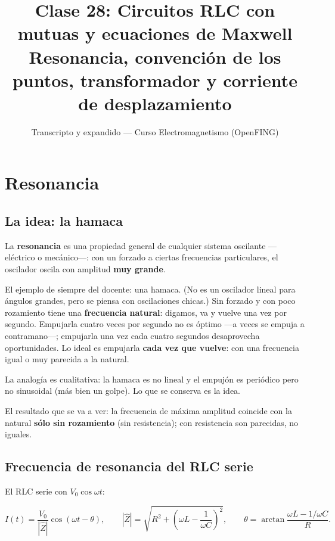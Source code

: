 \documentclass[12pt,a4paper]{article}
\title{\textbf{Clase 28: Circuitos RLC con mutuas y ecuaciones de Maxwell} \\[0.3em]
        \large{Resonancia, convención de los puntos, transformador y corriente de desplazamiento}}
\author{Transcripto y expandido --- Curso Electromagnetismo (OpenFING)}
\date{}
\begin{document}
\maketitle
\thispagestyle{empty}
\newpage

\tableofcontents
\newpage

\section{Resonancia}

\subsection{La idea: la hamaca}

La \textbf{resonancia} es una propiedad general de cualquier sistema oscilante
---eléctrico o mecánico---: con un forzado a ciertas frecuencias particulares, el
oscilador oscila con amplitud \textbf{muy grande}.

El ejemplo de siempre del docente: una hamaca. (No es un oscilador lineal para
ángulos grandes, pero se piensa con oscilaciones chicas.) Sin forzado y con poco
rozamiento tiene una \textbf{frecuencia natural}: digamos, va y vuelve una vez por
segundo. Empujarla cuatro veces por segundo no es óptimo ---a veces se empuja a
contramano---; empujarla una vez cada cuatro segundos desaprovecha oportunidades.
Lo ideal es empujarla \textbf{cada vez que vuelve}: con una frecuencia igual o muy
parecida a la natural.

\begin{notebox}
La analogía es cualitativa: la hamaca es no lineal y el empujón es periódico
pero no sinusoidal (más bien un golpe). Lo que se conserva es la idea.
\end{notebox}

El resultado que se va a ver: la frecuencia de máxima amplitud coincide con la
natural \textbf{sólo sin rozamiento} (sin resistencia); con resistencia son
parecidas, no iguales.

\subsection{Frecuencia de resonancia del RLC serie}

El RLC serie con $V_0\cos\omega t$:

\[
I(t) = \frac{V_0}{|\hat Z|}\cos(\omega t-\theta),
\qquad
|\hat Z| = \sqrt{R^2 + \left(\omega L - \frac{1}{\omega C}\right)^2},
\qquad
\theta = \arctan\frac{\omega L - 1/\omega C}{R}.
\]
\end{document}
